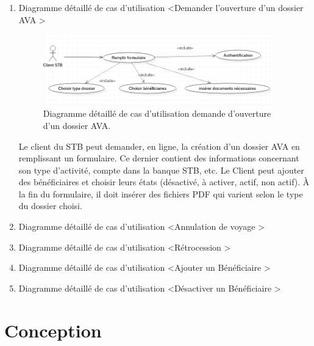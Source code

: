    
   \begin{enumerate}[label=(\alph*)]
   \item {Diagramme détaillé de cas d'utilisation \textless  Demander l'ouverture d'un dossier AVA \textgreater}
   
    \begin{figure}[!h]
\begin{center}

\includegraphics[width=10cm]{./conception/use_case_ouverture}

\caption{Diagramme détaillé de cas d'utilisation demande d'ouverture d'un dossier AVA.}
\end{center}
\end{figure}
 
  Le client du STB peut demander, en ligne, la création d'un dossier AVA en remplissant un formulaire.
Ce dernier contient des informations concernant son type d'activité, compte dans la banque STB, etc.
Le Client peut ajouter des bénéficiaires et choisir leurs états (désactivé, à activer, actif, non actif).
À la fin du formulaire, il doit insérer des fichiers PDF qui varient selon le type du dossier choisi.
 

   
    \item{Diagramme détaillé de cas d'utilisation \textless Annulation de voyage \textgreater}
    
     \item{Diagramme détaillé de cas d'utilisation \textless Rétrocession \textgreater}
     
     \item{Diagramme détaillé de cas d'utilisation \textless Ajouter un Bénéficiaire \textgreater}
     
      \item{Diagramme détaillé de cas d'utilisation \textless Désactiver un Bénéficiaire \textgreater}
    \end{enumerate}    
 


 \section{Conception}
 
